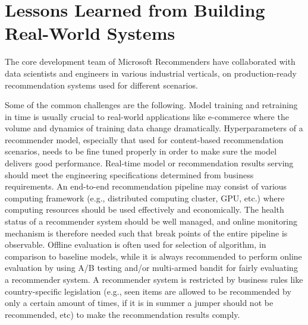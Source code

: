 \section{Lessons Learned from Building Real-World Systems} 

The core development team of Microsoft Recommenders have collaborated with data scientists and engineers 
in various industrial verticals, on production-ready recommendation systems used for different scenarios. 

Some of the common challenges %
are the following. Model training and retraining in time is usually crucial to real-world applications like e-commerce where the volume and dynamics of training data change dramatically. Hyperparameters of a recommender model, especially that used for content-based recommendation scenarios, needs to be fine tuned properly in order to make sure the model delivers good performance.
Real-time model or recommendation results serving should meet the engineering specifications determined from business requirements. An end-to-end recommendation pipeline may consist of various computing framework (e.g., distributed computing cluster, GPU, etc.) where computing resources should be used effectively and economically. The health status of a recommender system should be well managed, and online monitoring mechanism is therefore needed such that break points of the entire pipeline is observable. Offline evaluation is often used for selection of algorithm, in comparison to baseline models, while it is always recommended to perform online evaluation by using A/B testing and/or multi-armed bandit for fairly evaluating a recommender system. A recommender system is restricted by business rules like country-specific legislation (e.g., seen items are allowed to be recommended by only a certain amount of times, if it is in summer a jumper should not be recommended, etc) to make the recommendation results comply.

